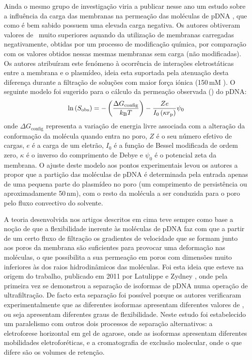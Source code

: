 Ainda o mesmo grupo de investigação viria a publicar nesse ano um estudo sobre a influência da carga das membranas na permeação das moléculas de pDNA \cite{ager}, que como é bem sabido possuem uma elevada carga negativa. Os autores obtiveram valores de \fluxocritico\ muito superiores aquando da utilização de membranas carregadas negativamente, obtidas por um processo de modificação química, por comparação com os valores obtidos nessas mesmas membranas sem carga (não modificadas). Os autores atribuíram este fenómeno à ocorrência de interações eletrostáticas entre a membrana e o plasmídeo, ideia esta suportada pela atenuação desta diferença durante a filtração de soluções com maior força iónica (150\,mM ). O seguinte modelo foi sugerido para o cálculo da permeação observada (\permobs) do pDNA:
\begin{equation}
\label{eq:ager}
\ln{\left(\ensuremath{S_{\mathrm{obs}}}\right)}=-\left( \frac{\Delta G_{\mathrm{config}}}{k_{\mathrm{B}} T}\right)-\frac{Ze}{I_{0}\left(\kappa r_{\mathrm{p}}\right)}\psi_{0}
\end{equation}
onde $\Delta G_{\mathrm{config}}$ representa a variação de energia livre associada com a alteração da conformação da molécula quando entra no poro, $Z$ é o seu número efetivo de cargas, $e$ é a carga de um eletrão, $I_{0}$ é a função de Bessel modificada de ordem zero, $\kappa$ é o inverso do comprimento de Debye e $\psi_{0}$ é o potencial zeta da membrana. O ajuste deste modelo aos pontos experimentais levou os autores a propor que a partição das moléculas de pDNA é determinada pela entrada apenas de uma pequena parte do plasmídeo no poro (um comprimento de persistência ou aproximadamente 50\,nm), com o resto da molécula a ser conduzida para o poro pelo fluxo convectivo do solvente.

A teoria desenvolvida nos artigos descritos em cima teve sempre como base a noção de que a flexibilidade inerente às moléculas de pDNA faz com que a partir de um certo fluxo de filtração os gradientes de velocidade que se formam junto aos poros da membrana são suficientes para provocar uma deformação nas moléculas, o que possibilita a sua permeação em poros com dimensões muito inferiores às dos raios hidrodinâmicos das moléculas. Foi esta ideia que esteve na origem do trabalho, publicado em 2011 por Latulippe e Zydney \cite{zydneyiso}, onde pela primeira vez se demonstrou a separação de isoformas de \mbox{pDNA} numa operação de ultrafiltração. 
De facto esta separação foi possível porque os autores verificaram experimentalmente que as diferentes isoformas apresentam diferentes valores de \fluxocritico, ou seja apresentam diferentes graus de flexibilidade. Neste estudo foi estabelecido um paralelismo com outros dois processos de separação alternativos: a eletroforese horizontal em gel de agarose, onde as isoformas apresentam diferentes mobilidades eletroforéticas, e a cromatografia de exclusão molecular, onde o que difere são os volumes de retenção. 

